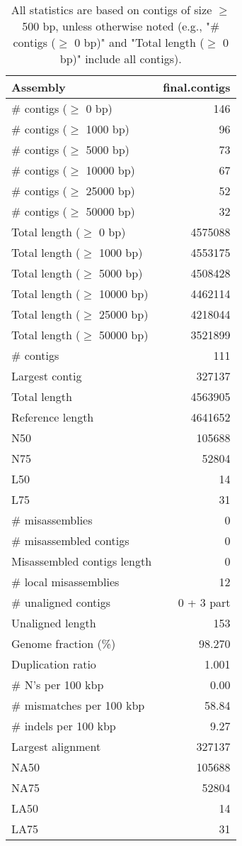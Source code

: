 \documentclass[12pt,a4paper]{article}
\begin{document}
\begin{table}[ht]
\begin{center}
\caption{All statistics are based on contigs of size $\geq$ 500 bp, unless otherwise noted (e.g., "\# contigs ($\geq$ 0 bp)" and "Total length ($\geq$ 0 bp)" include all contigs).}
\begin{tabular}{|l*{1}{|r}|}
\hline
Assembly & final.contigs \\ \hline
\# contigs ($\geq$ 0 bp) & 146 \\ \hline
\# contigs ($\geq$ 1000 bp) & 96 \\ \hline
\# contigs ($\geq$ 5000 bp) & 73 \\ \hline
\# contigs ($\geq$ 10000 bp) & 67 \\ \hline
\# contigs ($\geq$ 25000 bp) & 52 \\ \hline
\# contigs ($\geq$ 50000 bp) & 32 \\ \hline
Total length ($\geq$ 0 bp) & 4575088 \\ \hline
Total length ($\geq$ 1000 bp) & 4553175 \\ \hline
Total length ($\geq$ 5000 bp) & 4508428 \\ \hline
Total length ($\geq$ 10000 bp) & 4462114 \\ \hline
Total length ($\geq$ 25000 bp) & 4218044 \\ \hline
Total length ($\geq$ 50000 bp) & 3521899 \\ \hline
\# contigs & 111 \\ \hline
Largest contig & 327137 \\ \hline
Total length & 4563905 \\ \hline
Reference length & 4641652 \\ \hline
N50 & 105688 \\ \hline
N75 & 52804 \\ \hline
L50 & 14 \\ \hline
L75 & 31 \\ \hline
\# misassemblies & 0 \\ \hline
\# misassembled contigs & 0 \\ \hline
Misassembled contigs length & 0 \\ \hline
\# local misassemblies & 12 \\ \hline
\# unaligned contigs & 0 + 3 part \\ \hline
Unaligned length & 153 \\ \hline
Genome fraction (\%) & 98.270 \\ \hline
Duplication ratio & 1.001 \\ \hline
\# N's per 100 kbp & 0.00 \\ \hline
\# mismatches per 100 kbp & 58.84 \\ \hline
\# indels per 100 kbp & 9.27 \\ \hline
Largest alignment & 327137 \\ \hline
NA50 & 105688 \\ \hline
NA75 & 52804 \\ \hline
LA50 & 14 \\ \hline
LA75 & 31 \\ \hline
\end{tabular}
\end{center}
\end{table}
\end{document}
